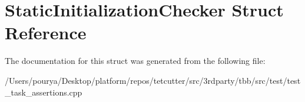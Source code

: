 \hypertarget{structStaticInitializationChecker}{}\section{Static\+Initialization\+Checker Struct Reference}
\label{structStaticInitializationChecker}


The documentation for this struct was generated from the following file\+:\begin{DoxyCompactItemize}
\item 
/\+Users/pourya/\+Desktop/platform/repos/tetcutter/src/3rdparty/tbb/src/test/test\+\_\+task\+\_\+assertions.\+cpp\end{DoxyCompactItemize}
